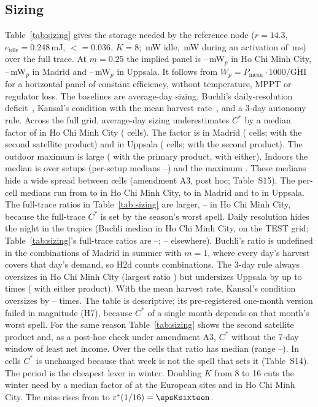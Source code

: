 \subsection{Sizing}\label{sec:sizing}
Table~\ref{tab:sizing} gives the storage needed by the reference node ($r=14.3$, $e_{\mathrm{idle}}=0.248$\,mJ, $\lt=0.036$, $K=8$; \Pidle\,mW idle, \Pact\,mW during an activation of \Tact\,ms) over the full trace. At $m=0.25$ the implied panel is \WpHCMCLo--\WpHCMCHi\,mW$_p$ in Ho Chi Minh City, \WpMadLo--\WpMadHi\,mW$_p$ in Madrid and \WpUppLo--\WpUppHi\,mW$_p$ in Uppsala. It follows from $W_p=P_{\mathrm{mean}}\cdot1000/\overline{\mathrm{GHI}}$ for a horizontal panel of constant efficiency, without temperature, MPPT or regulator loss. The baselines are average-day sizing, Buchli's daily-resolution deficit~\cite{buchli2014sensys}, Kansal's condition with the mean harvest rate~\cite{kansal2007}, and a 3-day autonomy rule. Across the full grid, average-day sizing underestimates $C^*$ by a median factor of \avgHCMC{} in Ho Chi Minh City (\nCellHCMC{} cells). The factor is \avgMadS{} in Madrid (\nCellMadS{} cells; \avgMadSec{} with the second satellite product) and \avgUppS{} in Uppsala (\nCellUppS{} cells; \avgUppSec{} with the second product). The outdoor maximum is large (\MaxOutPrim{} with the primary product, \avgMaxOut{} with either). Indoors the median is \avgIn{} over \nCellIn{} setups (per-setup medians \avgInSetupLo--\avgInSetupHi) and the maximum \avgMaxIn. These medians hide a wide spread between cells (amendment A3, post hoc; Table~S15). The per-cell medians run from \CellHCMCLo{} to \CellHCMCHi{} in Ho Chi Minh City, \CellMadLo{} to \CellMadHi{} in Madrid and \CellUppLo{} to \CellUppHi{} in Uppsala. The full-trace ratios in Table~\ref{tab:sizing} are larger, \FullRatioLo--\FullRatioHi{} in Ho Chi Minh City, because the full-trace $C^*$ is set by the season's worst spell. Daily resolution hides the night in the tropics (Buchli median \buHCMC{} in Ho Chi Minh City, on the TEST grid; Table~\ref{tab:sizing}'s full-trace ratios are \BuFullLo--\BuFullHi; \buLoS--\buHiS{} elsewhere). Buchli's ratio is undefined in the \nBuDrop{} combinations of Madrid in summer with $m=1$, where every day's harvest covers that day's demand, so H2d counts \nBuN{} combinations. The 3-day rule always oversizes in Ho Chi Minh City (largest ratio \threeHCMCmax) but undersizes Uppsala by up to \MaxThreeUppPrim{} times (\threeUppMax{} with either product). With the mean harvest rate, Kansal's condition oversizes by \kmeanInvLo--\kmeanInvHi{} times. The table is descriptive; its pre-registered one-month version failed in magnitude (H7), because $C^*$ of a single month depends on that month's worst spell. For the same reason Table~\ref{tab:sizing} shows the second satellite product and, as a post-hoc check under amendment A3, $C^*$ without the 7-day window of least net income. Over the \nCellsSS{} cells that ratio has median \WorstMedS{} (range \WorstMinS--\WorstMaxS). In \WorstOneS{} cells $C^*$ is unchanged because that week is not the spell that sets it (Table~S14). The period is the cheapest lever in winter. Doubling $K$ from 8 to 16 cuts the winter need by a median factor of \ckWinter{} at the European sites and \ckHCMC{} in Ho Chi Minh City. The miss rises from \epsKeight{} to $\eps^*(1/16)=\epsKsixteen$.


